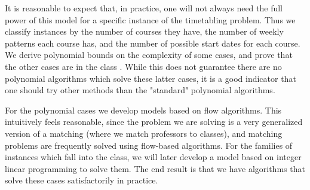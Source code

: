 It is reasonable to expect that, in practice, one will not always need the full power of this model for a specific instance of the timetabling problem. Thus we classify instances by the number of courses they have, the number of weekly patterns each course has, and the number of possible start dates for each course. We derive polynomial bounds on the complexity of some cases, and prove that the other cases are in the class \npc. While this does not guarantee there are no polynomial algorithms which solve these latter cases, it is a good indicator that one should try other methods than the "standard" polynomial algorithms.

For the polynomial cases we develop models based on flow algorithms. This intuitively feels reasonable, since the problem we are solving is a very generalized version of a matching (where we match professors to classes), and matching problems are frequently solved using flow-based algorithms\cite{clrs}. For the families of instances which fall into the \npc class, we will later develop a model based on integer linear programming to solve them. The end result is that we have algorithms that solve these cases satisfactorily in practice.
